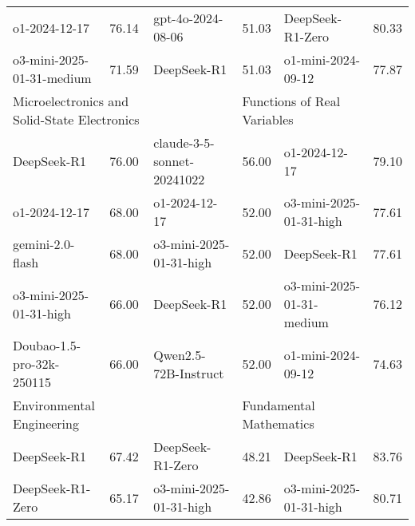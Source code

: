 {\begin{longtable}{p{4.2cm}>{\centering\arraybackslash} p{0.8cm}|p{4.2cm} >{\centering\arraybackslash} p{0.8cm}|p{4.2cm} >{\centering\arraybackslash} p{0.8cm}}
\cellcolor{blue!5} o1-2024-12-17 & \cellcolor{blue!2}76.14 & \cellcolor{purple!5} gpt-4o-2024-08-06 & \cellcolor{purple!2} 51.03 & \cellcolor{green!5} DeepSeek-R1-Zero & \cellcolor{green!2} 80.33\\
\cellcolor{blue!5} o3-mini-2025-01-31-medium & \cellcolor{blue!2}71.59 & \cellcolor{purple!5} DeepSeek-R1 & \cellcolor{purple!2} 51.03 & \cellcolor{green!5} o1-mini-2024-09-12 & \cellcolor{green!2} 77.87\\
\hline
\multicolumn{2}{p{5.15cm}|}{\cellcolor{blue!10} \centering Microelectronics and Solid-State Electronics} & \multicolumn{2}{p{5.15cm}|}{\cellcolor{purple!10} \centering Musical Forms and Analysis} & \multicolumn{2}{p{5.15cm}}{\cellcolor{green!10} \centering Functions of Real Variables}\\
\hline
\cellcolor{blue!5} DeepSeek-R1 & \cellcolor{blue!2}76.00 & \cellcolor{purple!5} claude-3-5-sonnet-20241022 & \cellcolor{purple!2} 56.00 & \cellcolor{green!5} o1-2024-12-17 & \cellcolor{green!2} 79.10\\
\cellcolor{blue!5} o1-2024-12-17 & \cellcolor{blue!2}68.00 & \cellcolor{purple!5} o1-2024-12-17 & \cellcolor{purple!2} 52.00 & \cellcolor{green!5} o3-mini-2025-01-31-high & \cellcolor{green!2} 77.61\\
\cellcolor{blue!5} gemini-2.0-flash & \cellcolor{blue!2}68.00 & \cellcolor{purple!5} o3-mini-2025-01-31-high & \cellcolor{purple!2} 52.00 & \cellcolor{green!5} DeepSeek-R1 & \cellcolor{green!2} 77.61\\
\cellcolor{blue!5} o3-mini-2025-01-31-high & \cellcolor{blue!2}66.00 & \cellcolor{purple!5} DeepSeek-R1 & \cellcolor{purple!2} 52.00 & \cellcolor{green!5} o3-mini-2025-01-31-medium & \cellcolor{green!2} 76.12\\
\cellcolor{blue!5} Doubao-1.5-pro-32k-250115 & \cellcolor{blue!2}66.00 & \cellcolor{purple!5} Qwen2.5-72B-Instruct & \cellcolor{purple!2} 52.00 & \cellcolor{green!5} o1-mini-2024-09-12 & \cellcolor{green!2} 74.63\\
\hline
\multicolumn{2}{p{5.15cm}|}{\cellcolor{blue!10} \centering Environmental Engineering} & \multicolumn{2}{p{5.15cm}|}{\cellcolor{purple!10} \centering Pitch and Scales} & \multicolumn{2}{p{5.15cm}}{\cellcolor{green!10} \centering Fundamental Mathematics}\\
\hline
\cellcolor{blue!5} DeepSeek-R1 & \cellcolor{blue!2}67.42 & \cellcolor{purple!5} DeepSeek-R1-Zero & \cellcolor{purple!2} 48.21 & \cellcolor{green!5} DeepSeek-R1 & \cellcolor{green!2} 83.76\\
\cellcolor{blue!5} DeepSeek-R1-Zero & \cellcolor{blue!2}65.17 & \cellcolor{purple!5} o3-mini-2025-01-31-high & \cellcolor{purple!2} 42.86 & \cellcolor{green!5} o3-mini-2025-01-31-high & \cellcolor{green!2} 80.71\\

\end{longtable}}
